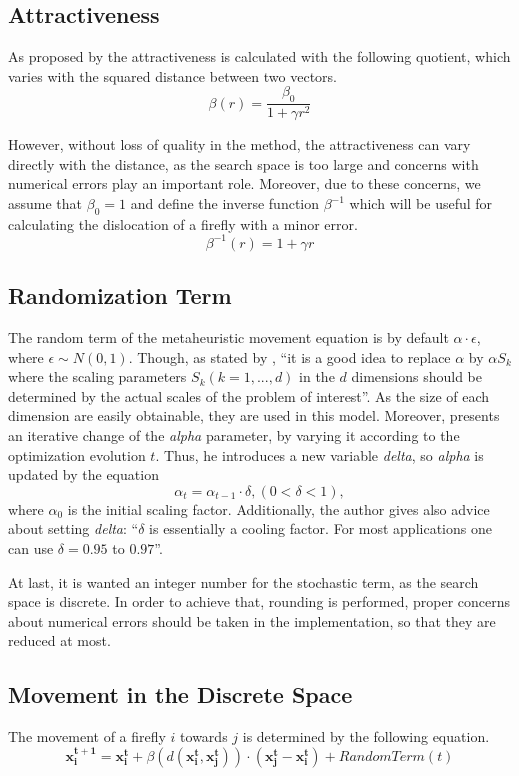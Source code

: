 \documentclass[tuberlin,cic,tc,openright,english,noabntcite,oneside]{iiufrgs}
\begin{document}
\subsection{Attractiveness}\label{sec:attractiveness}
As proposed by \textcite[p. 173]{yang_firefly_2009} the attractiveness is calculated with the following quotient, which varies with the squared distance between two vectors.
$$\beta(r) = \frac{\beta_{0}}{1 + \gamma r^2}$$

However, without loss of quality in the method, the attractiveness can vary directly with the distance, as the search space is too large and concerns with numerical errors play an important role. Moreover, due to these concerns, we assume that $\beta_0 = 1$ and define the inverse function $\beta^{-1}$ which will be useful for calculating the dislocation of a firefly with a minor error.
$$\beta^{-1}(r) = 1 + \gamma r$$

\subsection{Randomization Term}\label{sec:random_term}
The random term of the metaheuristic movement equation is by default $\alpha \cdot \epsilon$, where $\epsilon \sim N(0,1)$. Though, as stated by \textcite[p. 80]{yang_firefly_2010}, \enquote{it is a good idea to replace $\alpha$ by $\alpha S_k$ where the scaling parameters $S_k (k=1,...,d)$ in the $d$ dimensions should be determined by the actual scales of the problem of interest}. As the size of each dimension are easily obtainable, they are used in this model. Moreover, \textcite[p. 37-38]{yang_firefly_2013} presents an iterative change of the \emph{alpha} parameter, by varying it according to the optimization evolution $t$. Thus, he introduces a new variable \emph{delta}, so \emph{alpha} is updated by the equation
$$ \alpha_t = \alpha_{t-1} \cdot \delta, (0 < \delta < 1),$$ where $\alpha_0$ is the initial scaling factor. Additionally, the author gives also advice about setting \emph{delta}: \enquote{$\delta$ is essentially a cooling factor. For most applications one can use $\delta = 0.95$ to $0.97$}.

At last, it is wanted an integer number for the stochastic term, as the search space is discrete. In order to achieve that, rounding is performed, proper concerns about numerical errors should be taken in the implementation, so that they are reduced at most.

\subsection{Movement in the Discrete Space}
The movement of a firefly $i$ towards $j$ is determined by the following equation.
$$\mathbf{x^{t+1}_i} = \mathbf{x^{t}_i} + \beta(d(\mathbf{x^{t}_i}, \mathbf{x^{t}_j})) \cdot (\mathbf{x^{t}_j} - \mathbf{x^{t}_i}) + RandomTerm(t)$$
\end{document}
